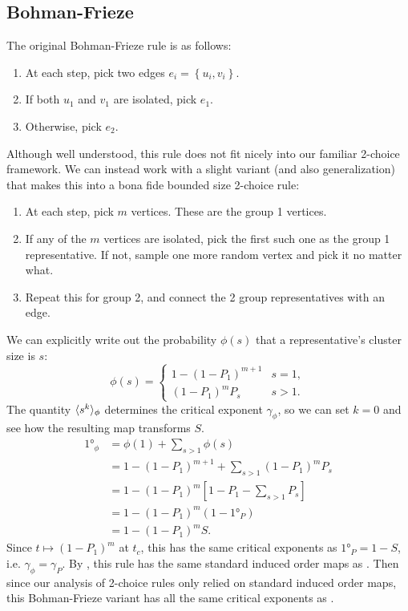 \documentclass[twoside,10pt]{article}
\newcommand{\BF}{Bohman-Frieze\xspace}
\begin{document}
\subsection{Bohman-Frieze}

The original \BF rule is as follows:
\begin{enumerate}
        \item At each step, pick two edges $e_i = \left\{ u_i, v_i \right\}$.
        \item If both $u_1$ and $v_1$ are isolated, pick $e_1$.
        \item Otherwise, pick $e_2$.
\end{enumerate}
Although well understood, this rule does not fit nicely into our familiar 2-choice framework. We can instead work with a slight variant (and also generalization) that makes this into a bona fide bounded size 2-choice rule:
\begin{enumerate}
        \item At each step, pick $m$ vertices. These are the group 1 vertices.         \item If any of the $m$ vertices are isolated, pick the first such one as the group 1 representative. If not, sample one more random vertex and pick it no matter what.
        \item Repeat this for group 2, and connect the 2 group representatives with an edge.
\end{enumerate}
We can explicitly write out the probability $\phi(s)$ that a representative's cluster size is $s$:
\[
        \phi(s)=
        \begin{cases}
                1 - (1-P_1)^{m+1} & s = 1, \\
                (1-P_1)^{m}P_s & s > 1.
        \end{cases}
\]
The quantity $\langle s^{k} \rangle_{\phi}$ determines the critical exponent $\gamma_{\phi}$, so we can set $k=0$ and see how the resulting map transforms $S$.
\begin{align*}
        \ang{1}_{\phi} &= \phi(1) + \sum_{s > 1} \phi(s) \\
                       &= 1 - (1-P_1)^{m+1} + \sum_{s>1}(1-P_1)^{m}P_s \\
                       &= 1 - (1-P_1)^{m} \left[ 1 - P_1 - \sum_{s>1}P_s \right] \\
                       &= 1 - (1-P_1)^{m} (1-\ang{1}_{P}) \\
                       &= 1 - (1-P_1)^{m} S.
\end{align*}
Since $t \mapsto (1-P_1)^{m}$  at $t_c$, this has the same critical exponents as $\ang{1}_{P} = 1-S$, i.e. $\gamma_{\phi} = \gamma_{P}$. By , this rule has the same standard induced order maps as \ER. Then since our analysis of 2-choice rules only relied on standard induced order maps, this \BF variant has all the same critical exponents as \ER.
\end{document}
